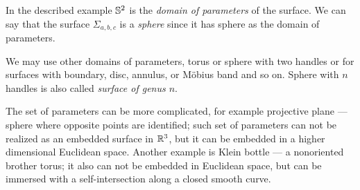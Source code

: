 In the described example $\mathbb{S}^2$ is the \emph{domain of parameters} of the surface.
We can say that the surface $\Sigma_{a,b,c}$ is a \emph{sphere} since it has sphere as the domain of parameters.

We may use other domains of parameters, torus or sphere with two handles or for surfaces with boundary, disc, annulus, or M\"obius band and so on.
Sphere with $n$ handles is also called \emph{surface of genus $n$}.

The set of parameters can be more complicated, for example projective plane --- sphere where opposite points are identified; such set of parameters can not be realized as an embedded surface in $\mathbb{R}^3$, but it can be embedded in a higher dimensional Euclidean space.
Another example is Klein bottle --- a nonoriented brother torus;
it also can not be embedded in Euclidean space, but can be immersed with a self-intersection along a closed smooth curve.










